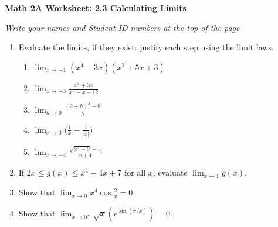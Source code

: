 \documentclass[12pt,fleqn]{article}
\begin{document}
\begin{center}
	\textbf{Math 2A Worksheet: 2.3 Calculating Limits}
\end{center}

\emph{Write your names and Student ID numbers at the top of the page}


\begin{enumerate}
\item Evaluate the limits, if they exist: justify each step using the limit laws.
\begin{enumerate}
\item $\displaystyle\lim_{x\to-1}(x^4-3x)(x^2+5x+3)$\vfill



\item $\displaystyle\lim_{x\to-3}\frac{x^2+3x}{x^2-x-12}$\vfill

\item $\displaystyle\lim_{h\to0}\frac{(2+h)^3-8}{h}$\vfill

\item $\displaystyle\lim_{x\to0}\bigg(\frac{1}{x}-\frac{1}{|x|}\bigg)$\vfill



\item $\displaystyle\lim_{x\to-4}\frac{\sqrt{x^2+9}-5}{x+4}$\vfill


\end{enumerate}

\newpage

\item If $2x\leq g(x)\leq x^4-4x+7$ for all $x$, evaluate $\displaystyle \lim_{x\to1}g(x)$.\vfill

\item Show that $\displaystyle\lim_{x\to0}x^4\cos\frac{2}{x}=0$.\vfill

\item Show that $\displaystyle\lim_{x\to0^+}\sqrt{x}(e^{\sin(\pi/x)})=0$.\vfill

\end{enumerate}
\end{document}
